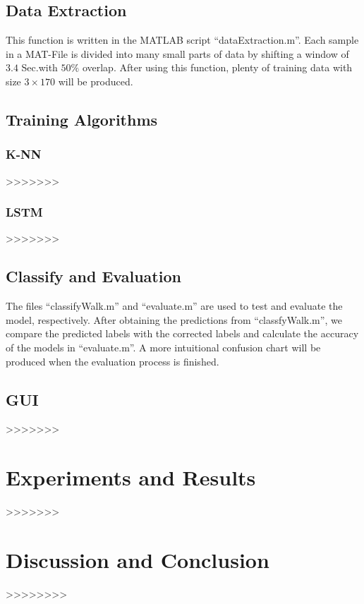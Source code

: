 \documentclass{article}
\begin{document}
\subsection{Data Extraction}\label{section2.3}
This function is written in the MATLAB script “dataExtraction.m”. Each sample in a MAT-File is divided into many small parts of data by shifting a window of $3.4$ Sec.with $50\%$ overlap. After using this function, plenty of training data with size $3\times170$ will be produced.

\subsection{Training Algorithms}\label{section2.4}
\subsubsection{K-NN}
>>>>>>>
\subsubsection{LSTM}
>>>>>>>
\subsection{Classify and Evaluation}\label{section2.5}
The files “classifyWalk.m” and “evaluate.m” are used to test and evaluate the model, respectively. 
After obtaining the predictions from “classfyWalk.m”, we compare the predicted labels with the corrected labels and calculate the accuracy of the models in “evaluate.m”. A more intuitional confusion chart will be produced when the evaluation process is finished. 

\subsection{GUI}\label{section2.6}
>>>>>>>
\section{Experiments and Results}\label{section3}
>>>>>>>
\section{Discussion and Conclusion}\label{section4}
>>>>>>>>


\end{document}
